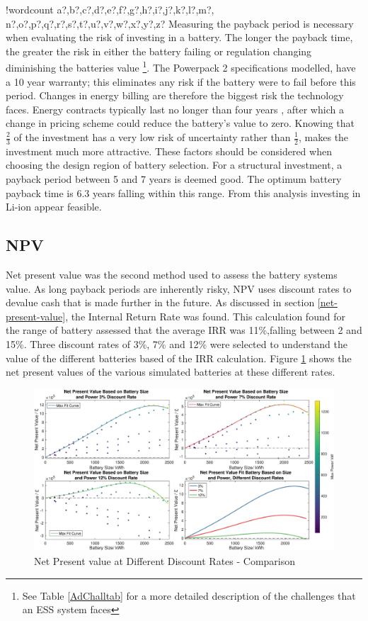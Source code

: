 \documentclass[fontsize=9.5pt]{extarticle}
\numberwithin{figure}{section} %
\newcounter{words}
\newenvironment{counted}{%
  \setcounter{words}{0}
  \SearchList!{wordcount}{\stepcounter{words}}
    {a?,b?,c?,d?,e?,f?,g?,h?,i?,j?,k?,l?,m?,
    n?,o?,p?,q?,r?,s?,t?,u?,v?,w?,x?,y?,z?}
  \UndoBoundary{'}
  \SearchOrder{p;}}{%
  \StopSearching}
\begin{document}
\begin{counted}
Measuring the payback period is necessary when evaluating the risk of
investing in a battery. The longer the payback time, the greater the
risk in either the battery failing or regulation changing diminishing
the batteries value
\footnote{See Table \ref{AdChalltab} for a more detailed description of the challenges that an ESS system faces}.
The Powerpack 2 specifications modelled, have a 10 year warranty; this
eliminates any risk if the battery were to fail before this period.
Changes in energy billing are therefore the biggest risk the technology
faces. Energy contracts typically last no longer than four years
\cite{wpMWMD}, after which a change in pricing scheme could reduce the
battery's value to zero. Knowing that \(\frac{2}{3}\) of the investment
has a very low risk of uncertainty rather than \(\frac{1}{2}\), makes
the investment much more attractive. These factors should be considered
when choosing the design region of battery selection. For a structural
investment, a payback period between 5 and 7 years is deemed good. The
optimum battery payback time is 6.3 years falling within this range.
From this analysis investing in Li-ion appear feasible.

\subsection{NPV}\label{npv}

Net present value was the second method used to assess the battery
systems value. As long payback periods are inherently risky, NPV uses
discount rates to devalue cash that is made further in the future. As
discussed in section \ref{net-present-value}, the Internal Return Rate
was found. This calculation found for the range of battery assessed that
the average IRR was 11\%,falling between 2 and 15\%. Three discount
rates of 3\%, 7\% and 12\% were selected to understand the value of the
different batteries based of the IRR calculation. Figure \ref{SRNPV1}
shows the net present values of the various simulated batteries at these
different rates.

\begin{figure}[H]
 \centering
 \includegraphics[trim = 0 0 0 0, clip, width=1\textwidth]{npv1.eps}
 \caption{Net Present value at Different Discount Rates - Comparison}
 \label{SRNPV1}
 \vspace{-20pt}
\end{figure}


\end{counted}
\end{document}

